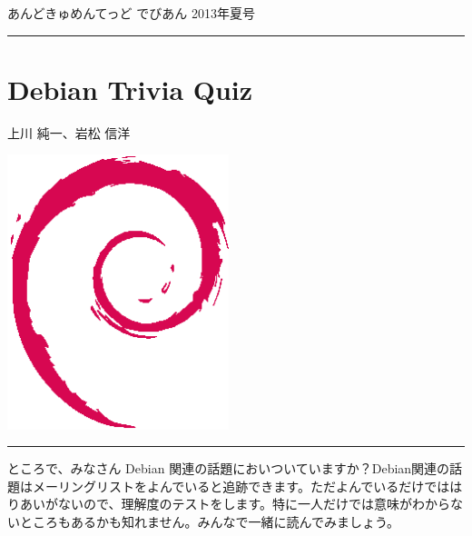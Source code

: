 \documentclass[mingoth,a4paper]{jsarticle}
\renewcommand{\dancersection}[2]{%
\newpage
あんどきゅめんてっど でびあん 2013年夏号
%
\vspace{0.1mm}\\
{\color{dancerdarkblue}\rule{\hsize}{2mm}}

%
%
\begin{minipage}[t]{0.6\hsize}
\color{dancerdarkblue}
\vspace{1cm}
\section{#1}
\hfill{}#2\\
\end{minipage}
\begin{minipage}[t]{0.4\hsize}
\vspace{-2cm}
\hfill{}\includegraphics[height=8cm]{image200502/openlogo-nd.eps}\\
\vspace{-5cm}
\end{minipage}
%
{\color{dancerlightblue}\rule{0.66\hsize}{2mm}}
%
\vspace{2cm}
}
\begin{document}
%
%
%


\clearpage





\dancersection{Debian Trivia Quiz}{上川 純一、岩松 信洋}

ところで、みなさん Debian 関連の話題においついていますか？Debian関連の話
題はメーリングリストをよんでいると追跡できます。ただよんでいるだけではは
りあいがないので、理解度のテストをします。特に一人だけでは意味がわからな
いところもあるかも知れません。みんなで一緒に読んでみましょう。
\end{document}
